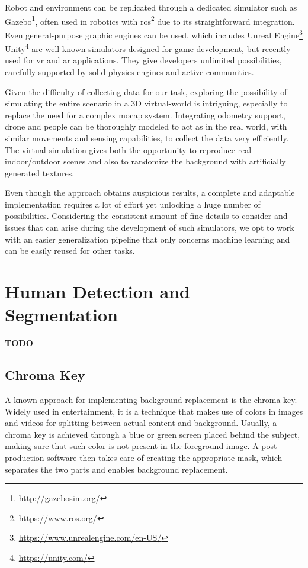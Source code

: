 Robot and environment can be replicated through a dedicated simulator such as Gazebo\footnote{\url{http://gazebosim.org/}}, often used in robotics with \gls{ros}\footnote{\url{https://www.ros.org/}} due to its straightforward integration. Even general-purpose graphic engines can be used, which includes Unreal Engine\footnote{\url{https://www.unrealengine.com/en-US/}} Unity\footnote{\url{https://unity.com/}} are well-known simulators designed for game-development, but recently used for \gls{vr} and \gls{ar} applications. They give developers unlimited possibilities, carefully supported by solid physics engines and active communities.

\medskip

Given the difficulty of collecting data for our task, exploring the possibility of simulating the entire scenario in a 3D virtual-world is intriguing, especially to replace the need for a complex \gls{mocap} system. Integrating odometry support, drone and people can be thoroughly modeled to act as in the real world, with similar movements and sensing capabilities, to collect the data very efficiently. The virtual simulation gives both the opportunity to reproduce real indoor/outdoor scenes and also to randomize the background with artificially generated textures.

Even though the approach obtains auspicious results, a complete and adaptable implementation requires a lot of effort yet unlocking a huge number of possibilities. Considering the consistent amount of fine details to consider and issues that can arise during the development of such simulators, we opt to work with an easier generalization pipeline that only concerns machine learning and can be easily reused for other tasks.




\section{Human Detection and Segmentation}
\label{sec:sota-humandetseg}

\textbf{TODO}



\subsection{Chroma Key}

A known approach for implementing background replacement is the chroma key. Widely used in entertainment, it is a technique that makes use of colors in images and videos for splitting between actual content and background. Usually, a chroma key is achieved through a blue or green screen placed behind the subject, making sure that such color is not present in the foreground image. A post-production software then takes care of creating the appropriate mask, which separates the two parts and enables background replacement.

